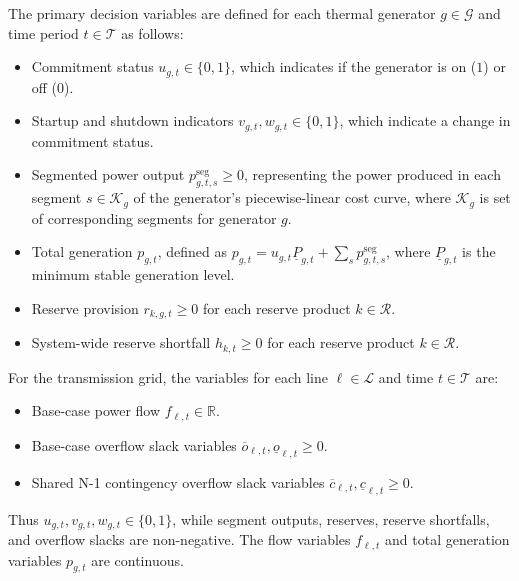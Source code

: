 \documentclass[runningheads]{llncs}
\begin{document}
The primary decision variables are defined for each thermal generator $g\in\mathcal{G}$ and time period $t\in\mathcal{T}$ as follows:
\begin{itemize}
    \item Commitment status $u_{g,t}\in\{0,1\}$, which indicates if the generator is on ($1$) or off ($0$).
    \item Startup and shutdown indicators $v_{g,t}, w_{g,t}\in\{0,1\}$, which indicate a change in commitment status.
    \item Segmented power output $p^{\mathrm{seg}}_{g,t,s}\ge 0$, representing the power produced in each segment $s \in \mathcal{K}_g$ of the generator's piecewise-linear cost curve, where $\mathcal{K}_g$ is set of corresponding segments for generator $g$.
    \item Total generation $p_{g,t}$, defined as $p_{g,t}=u_{g,t}\underline{P}_{g,t}+\sum_{s}p^{\mathrm{seg}}_{g,t,s}$, where $\underline{P}_{g,t}$ is the minimum stable generation level.
    \item Reserve provision $r_{k,g,t}\ge 0$ for each reserve product $k\in\mathcal{R}$.
    \item System-wide reserve shortfall $h_{k,t}\ge 0$ for each reserve product $k\in\mathcal{R}$.
\end{itemize}

For the transmission grid, the variables for each line $\ell\in\mathcal{L}$ and time $t\in\mathcal{T}$ are:
\begin{itemize}
    \item Base-case power flow $f_{\ell,t}\in\mathbb{R}$.
    \item Base-case overflow slack variables $\overline{o}_{\ell,t},\underline{o}_{\ell,t}\ge 0$.
    \item Shared N-1 contingency overflow slack variables $\overline{c}_{\ell,t},\underline{c}_{\ell,t}\ge 0$.
\end{itemize}
Thus $u_{g,t},v_{g,t},w_{g,t}\in\{0,1\}$, while segment outputs, reserves, reserve shortfalls, and overflow slacks are non-negative. The flow variables $f_{\ell,t}$ and total generation variables $p_{g,t}$ are continuous.
\end{document}
